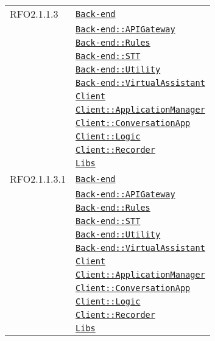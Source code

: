 \begin{longtable}{|>{\centering}m{3cm}|m{10cm}<{\centering}|}
RFO2.1.1.3 & \hyperref[Back-end]{\texttt{Back-end}}\\
& \hyperref[Back-end::APIGateway]{\texttt{Back-end::APIGateway}}\\
& \hyperref[Back-end::Rules]{\texttt{Back-end::Rules}}\\
& \hyperref[Back-end::STT]{\texttt{Back-end::STT}}\\
& \hyperref[Back-end::Utility]{\texttt{Back-end::Utility}}\\
& \hyperref[Back-end::VirtualAssistant]{\texttt{Back-end::VirtualAssistant}}\\
& \hyperref[Client]{\texttt{Client}}\\
& \hyperref[Client::ApplicationManager]{\texttt{Client::ApplicationManager}}\\
& \hyperref[Client::ConversationApp]{\texttt{Client::ConversationApp}}\\
& \hyperref[Client::Logic]{\texttt{Client::Logic}}\\
& \hyperref[Client::Recorder]{\texttt{Client::Recorder}}\\
& \hyperref[Libs]{\texttt{Libs}}\\ \hline

RFO2.1.1.3.1 & \hyperref[Back-end]{\texttt{Back-end}}\\
& \hyperref[Back-end::APIGateway]{\texttt{Back-end::APIGateway}}\\
& \hyperref[Back-end::Rules]{\texttt{Back-end::Rules}}\\
& \hyperref[Back-end::STT]{\texttt{Back-end::STT}}\\
& \hyperref[Back-end::Utility]{\texttt{Back-end::Utility}}\\
& \hyperref[Back-end::VirtualAssistant]{\texttt{Back-end::VirtualAssistant}}\\
& \hyperref[Client]{\texttt{Client}}\\
& \hyperref[Client::ApplicationManager]{\texttt{Client::ApplicationManager}}\\
& \hyperref[Client::ConversationApp]{\texttt{Client::ConversationApp}}\\
& \hyperref[Client::Logic]{\texttt{Client::Logic}}\\
& \hyperref[Client::Recorder]{\texttt{Client::Recorder}}\\
& \hyperref[Libs]{\texttt{Libs}}\\ \hline


\end{longtable}
